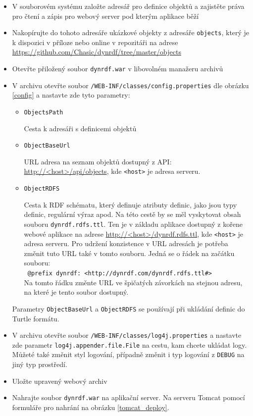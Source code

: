 \documentclass[thesis=B,czech]{FITthesis}[2012/06/26]
\begin{document}
  \begin{itemize}
   \item V souborovém systému založte adresář pro definice objektů a zajistěte práva pro čtení a zápis pro webový server pod kterým aplikace běží
   \item Nakopírujte do tohoto adresáře ukázkové objekty z adresáře \texttt{objects}, který je k dispozici v příloze nebo online v repozitáři
   na adrese \url{https://github.com/Chasic/dynrdf/tree/master/objects}
   \item Otevřte přiložený soubor \texttt{dynrdf.war} v libovolném manažeru archivů
   \item V archivu otevřte soubor \texttt{/WEB-INF/classes/config.properties} dle obrázku \ref{config} a nastavte zde tyto parametry:
   
    \begin{itemize}
    \item \texttt{ObjectsPath}
    
    Cesta k adresáři s definicemi objektů
    \item \texttt{ObjectBaseUrl} 
    
    URL adresa na seznam objektů dostupný z API: \url{http://<host>/api/objects}, kde \texttt{<host>} je adresa serveru.
       
    \item \texttt{ObjectRDFS} 
    
    Cesta k RDF schématu, který definuje atributy definic, jako jsou typy definic, regulární výraz apod. Na této cestě by se měl vyskytovat obsah souboru 
    \texttt{dynrdf.rdfs.ttl}. Ten je v základu aplikace dostupný z kořene webové aplikace na adrese \url{http://<host>/dynrdf.rdfs.ttl}, kde \texttt{<host>} 
    je adresa serveru. Pro udržení konzistence v URL adresách je potřeba změnit tuto URL také v tomto souboru. Jedná se o řádek na začátku souboru:
    \\
      \texttt{ @prefix dynrdf: <http://dynrdf.com/dynrdf.rdfs.ttl\#>}
      \\	
      Na tomto řádku změnte URL ve špičatých závorkách na stejnou adresu, na které je tento soubor dostupný.
    
    
   \end{itemize}  
   Parametry \texttt{ObjectBaseUrl} a \texttt{ObjectRDFS} se používají při ukládání definic do Turtle formátu.
  

   \item V archivu otevřte soubor \texttt{/WEB-INF/classes/log4j.properties} a nastavte zde parametr \texttt{log4j.appender.file.File} na cestu,
   kam chcete ukládat logy.
   Můžeté také změnit styl logování, případně změnit i typ logování z \texttt{DEBUG} na jiný typ prostředí.
   \item Uložte upravený webový archiv
   \item Nahrajte soubor \texttt{dynrdf.war} na aplikační server. Na serveru Tomcat pomocí formuláře pro nahrání na obrázku \ref{tomcat_deploy}.
  \end{itemize}
\end{document}
